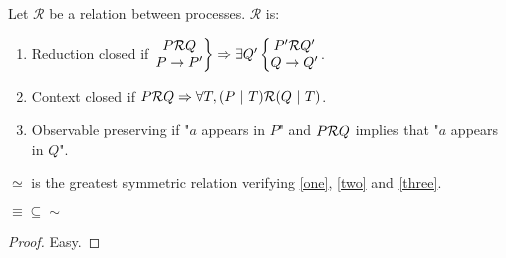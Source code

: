 	\begin{definition}
		Let $\mathcal R$ be a relation between processes. $\mathcal R$ is:
		\begin{enumerate}
			\item Reduction closed if $ \left . \begin{matrix} P {\mathcal R} Q \\ P \rightarrow P' \end{matrix}\right \} \Rightarrow \exists Q'	
			\left \{ \begin{matrix} P' {\mathcal R} Q' \\ Q \rightarrow Q'\end{matrix} \right .$.
				\label{one}
			\item Context closed if  $P{\mathcal R} Q \Rightarrow  \forall T, (P \ |\  T) {\mathcal R} (Q \ |\  T)$.
			\label{two}
			\item Observable preserving if "$a$ appears in $P$" and $P{\mathcal R} Q$ implies that "$a$ appears in $Q$".
			\label{three}
		\end{enumerate}
	\end{definition}
	
	\begin{definition}
		$\simeq$ is the greatest symmetric relation verifying \ref{one}, \ref{two} and \ref{three}.
	\end{definition}
	
	
	\begin{lemma}\label{lem:equiv_sim}
		$\equiv \subseteq \sim$
	\end{lemma}
	\begin{proof}
		Easy.
	\end{proof}
	
